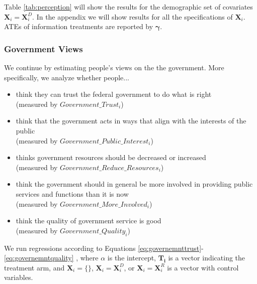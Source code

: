 \documentclass[11pt]{article}
\begin{document}
Table \ref{tab:perception} will show the results for the demographic set of covariates $\mathbf{X}_{i} = \mathbf{X}_{i}^{D}$. In the appendix we will show results for all the specifications of $\mathbf{X}_{i}$. ATEs of information treatments are reported by $\boldsymbol{\gamma}$.
\subsubsection{Government Views}
We continue by estimating people's views on the the government. More specifically, we analyze whether people...
\begin{itemize}
    \item think they can trust the federal government to do what is right\\(measured by $Government\_Trust_i$)
    \item think that the government acts in ways that align with the interests of the public \\(measured by $Government\_Public\_Interest_i$)
    \item thinks government resources should be decreased or increased \\(measured by $Government\_Reduce\_Resources_i$)
    \item think the government should in general be more involved in providing public services and functions than it is now \\(measured by $Government\_More\_Involved_i$)
    \item think the quality of government service is good \\(measured by $Government\_Quality_i$)
\end{itemize}

We run regressions according to Equations \ref{eq:governemnttrust}-\ref{eq:governemntquality} , where $\alpha$ is the intercept, $\mathbf{T_i}$ is a vector indicating the treatment arm, and $\mathbf{X}_{i} = \{\}$, $\mathbf{X}_{i} = \mathbf{X}_{i}^{D}$, or  $\mathbf{X}_{i} = \mathbf{X}_{i}^{R}$ is a vector with control variables. 
\end{document}
